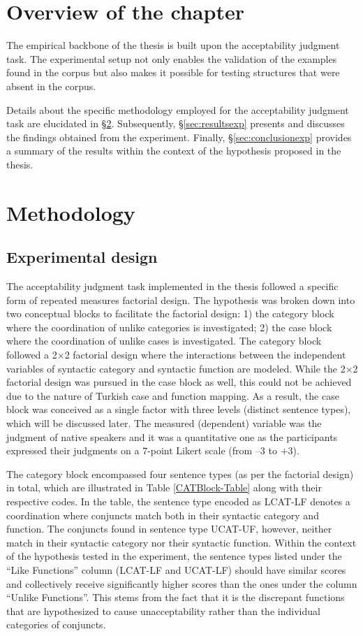 \section{Overview of the chapter}

The empirical backbone of the thesis is built upon the acceptability judgment task. The experimental setup not only enables the validation of the examples found in the corpus but also makes it possible for testing structures that were absent in the corpus. 

Details about the specific methodology employed for the acceptability judgment task are elucidated in \S \ref{sec:methodologyexp}. Subsequently, \S \ref{sec:resultsexp} presents and discusses the findings obtained from the experiment. Finally, \S \ref{sec:conclusionexp} provides a summary of the results within the context of the hypothesis proposed in the thesis.

\section{Methodology} \label{sec:methodologyexp}
\subsection{Experimental design} \label{sec:experimentaldesign}
The acceptability judgment task implemented in the thesis followed a specific form of repeated measures factorial design. The hypothesis was broken down into two conceptual blocks to facilitate the factorial design: 1) the category block where the coordination of unlike categories is investigated; 2) the case block where the coordination of unlike cases is investigated. The category block followed a 2$\times$2 factorial design where the interactions between the independent variables of syntactic category and syntactic function are modeled. While the 2$\times$2 factorial design was pursued in the case block as well, this could not be achieved due to the nature of Turkish case and function mapping. As a result, the case block was conceived as a single factor with three levels (distinct sentence types), which will be discussed later. The measured (dependent) variable was the judgment of native speakers and it was a quantitative one as the participants expressed their judgments on a 7-point Likert scale (from --3 to $+$3). 

The category block encompassed four sentence types (as per the factorial design) in total, which are illustrated in Table \ref{CATBlock-Table} along with their respective codes.
In the table, the sentence type encoded as LCAT-LF denotes a coordination where conjuncts match both in their syntactic category and function. The conjuncts found in sentence type UCAT-UF, however, neither match in their syntactic category nor their syntactic function. Within the context of the hypothesis tested in the experiment, the sentence types listed under the ``Like Functions'' column (LCAT-LF and UCAT-LF) should have similar scores and collectively receive significantly higher scores than the ones under the column ``Unlike Functions''. This stems from the fact that it is the discrepant functions that are hypothesized to cause unacceptability rather than the individual categories of conjuncts.

